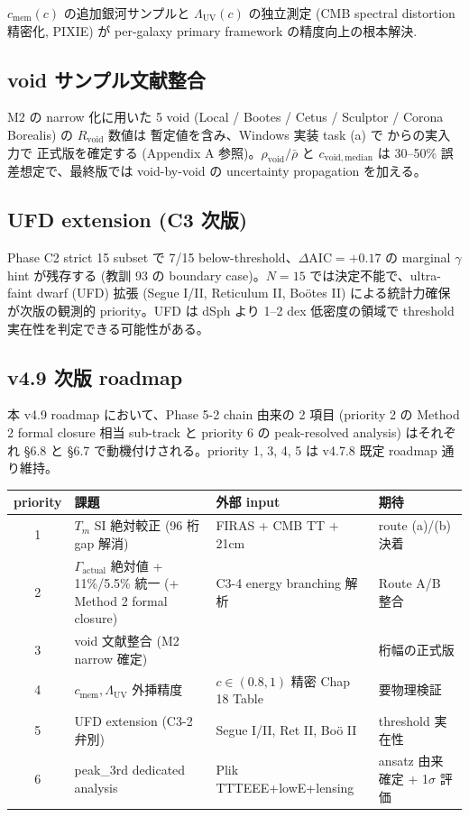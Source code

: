 \documentclass[11pt,a4paper]{ltjsarticle}
\newcommand{\cmem}{c_{\mathrm{mem}}}
\newcommand{\Tm}{T_{m}}
\newcommand{\Lambdauv}{\Lambda_{\mathrm{UV}}}
\newcommand{\Gammaact}{\Gamma_{\mathrm{actual}}}
\newcommand{\Rvoid}{R_{\mathrm{void}}}
\newcommand{\AIC}{\Delta\mathrm{AIC}}
\begin{document}
$\cmem(c)$ の追加銀河サンプルと $\Lambdauv(c)$ の独立測定 (CMB spectral distortion 精密化,
\citet{Kogut2011} PIXIE) が per-galaxy primary framework の精度向上の根本解決.

\subsection{void サンプル文献整合}
M2 の narrow 化に用いた 5 void (Local / Bootes / Cetus / Sculptor / Corona Borealis) の $\Rvoid$ 数値は
暫定値を含み、Windows 実装 task (a) で \citet{Kreckel2011, Pan2012, Ricciardelli2014} からの実入力で
正式版を確定する (Appendix A 参照)。$\rho_{\mathrm{void}}/\bar{\rho}$ と $c_{\mathrm{void,median}}$ は
30--50\% 誤差想定で、最終版では void-by-void の uncertainty propagation を加える。

\subsection{UFD extension (C3 次版)}
Phase C2 strict 15 subset で 7/15 below-threshold、$\AIC = +0.17$ の marginal $\gamma$ hint が残存する
(教訓 93 の boundary case)。$N=15$ では決定不能で、ultra-faint dwarf (UFD) 拡張
(Segue I/II, Reticulum II, Boötes II) による統計力確保が次版の観測的 priority。UFD は dSph より
1--2 dex 低密度の領域で threshold 実在性を判定できる可能性がある。

\subsection{v4.9 次版 roadmap}

本 v4.9 roadmap において、Phase 5-2 chain 由来の 2 項目 (priority 2 の
Method 2 formal closure 相当 sub-track と priority 6 の peak-resolved
analysis) はそれぞれ \S 6.8 と \S 6.7 で動機付けされる。priority 1, 3, 4,
5 は v4.7.8 既定 roadmap 通り維持。

\begin{center}\small
\begin{tabularx}{\linewidth}{@{}c >{\raggedright\arraybackslash}X >{\raggedright\arraybackslash}X >{\raggedright\arraybackslash}X@{}}
\toprule
priority & 課題 & 外部 input & 期待 \\
\midrule
1 & $\Tm$ SI 絶対較正 (96 桁 gap 解消) & FIRAS + CMB TT + 21cm & route (a)/(b) 決着 \\
2 & $\Gammaact$ 絶対値 + 11\%/5.5\% 統一 (+ Method 2 formal closure) & C3-4 energy branching 解析 & Route A/B 整合 \\
3 & void 文献整合 (M2 narrow 確定) & \citet{Kreckel2011, Pan2012} & 5 桁幅の正式版 \\
4 & $\cmem, \Lambdauv$ 外挿精度 & $c \in (0.8, 1)$ 精密 Chap 18 Table & 要物理検証 \\
5 & UFD extension (C3-2 弁別) & Segue I/II, Ret II, Boö II & threshold 実在性 \\
6 & peak\_3rd dedicated analysis & Plik TTTEEE+lowE+lensing & ansatz 由来確定 + 1$\sigma$ 評価 \\
\bottomrule
\end{tabularx}
\end{center}
\end{document}
